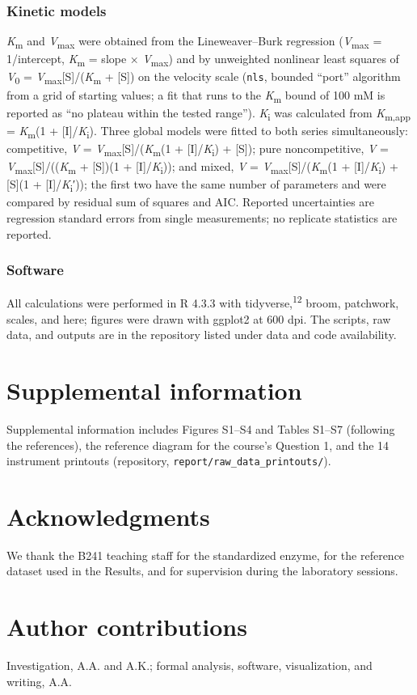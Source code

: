 \documentclass[9pt,twocolumn]{extarticle}
\newcommand{\cit}[1]{\textsuperscript{#1}}
\newcommand{\Km}{\textit{K}\textsubscript{m}}
\newcommand{\Kmapp}{\textit{K}\textsubscript{m,app}}
\newcommand{\Vmax}{\textit{V}\textsubscript{max}}
\newcommand{\Vo}{\textit{V}\textsubscript{0}}
\newcommand{\Ki}{\textit{K}\textsubscript{i}}
\newcommand{\Kip}{\textit{K}\textsubscript{i}′}
\newcommand{\dash}{–}
\begin{document}
\subsubsection{Kinetic models}
\Km{} and \Vmax{} were obtained from the Lineweaver\dash Burk regression (\Vmax{} = 1/intercept, \Km{} = slope × \Vmax) and by unweighted nonlinear least squares of \Vo{} = \Vmax[S]/(\Km{} + [S]) on the velocity scale (\texttt{nls}, bounded ``port'' algorithm from a grid of starting values; a fit that runs to the \Km{} bound of 100 mM is reported as ``no plateau within the tested range''). \Ki{} was calculated from \Kmapp{} = \Km(1 + [I]/\Ki). Three global models were fitted to both series simultaneously: competitive, \textit{V} = \Vmax[S]/(\Km(1 + [I]/\Ki) + [S]); pure noncompetitive, \textit{V} = \Vmax[S]/((\Km{} + [S])(1 + [I]/\Ki)); and mixed, \textit{V} = \Vmax[S]/(\Km(1 + [I]/\Ki) + [S](1 + [I]/\Kip)); the first two have the same number of parameters and were compared by residual sum of squares and AIC. Reported uncertainties are regression standard errors from single measurements; no replicate statistics are reported.
\subsubsection{Software}
All calculations were performed in R 4.3.3 with tidyverse,\cit{12} broom, patchwork, scales, and here; figures were drawn with ggplot2 at 600 dpi. The scripts, raw data, and outputs are in the repository listed under data and code availability.

\section{Supplemental information}
Supplemental information includes Figures S1\dash S4 and Tables S1\dash S7 (following the references), the reference diagram for the course's Question 1, and the 14 instrument printouts (repository, \texttt{report/raw\_data\_printouts/}).

\section{Acknowledgments}
We thank the B241 teaching staff for the standardized enzyme, for the reference dataset used in the Results, and for supervision during the laboratory sessions.

\section{Author contributions}
Investigation, A.A. and A.K.; formal analysis, software, visualization, and writing, A.A.
\end{document}
